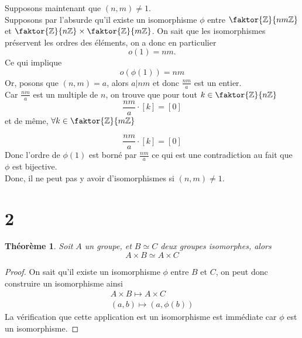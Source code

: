 \documentclass[11pt, a4paper, twoside]{article}
\newtheorem{thm}{Théorème}
\newcommand{\f}{\faktor}
\begin{document}
Supposons maintenant que $( n,m) \neq1$.\\
Supposons par l'absurde qu'il existe un isomorphisme $\phi$ entre $\f { \mathbb{Z}} { nm \mathbb{Z}} $ et $\f { \mathbb{Z}} { n\mathbb{Z}} \times\f { \mathbb{Z}} { m \mathbb{Z}} $.
On sait que les isomorphismes préservent les ordres des éléments, on a donc en particulier
\[ 
	o( 1) = nm.
\]
Ce qui implique
\[ 
	o(\phi( 1)) = nm
\]
Or, posons que $( n,m) = a$,  alors $a|nm$ et donc $\frac{nm}{a}$ est un entier.\\
Car $\frac{nm}{a}$ est un multiple de $n$, on trouve que pour tout $k \in \f { \mathbb{Z}} { n\mathbb{Z}}$ 
\[ 
\frac{nm}{a} \cdot [ k ] = [ 0 ]
\]
et de même, $\forall k \in\f { \mathbb{Z}} { m\mathbb{Z}} $

\[ 
\frac{nm}{a} \cdot [ k ] = [ 0 ]
\]
Donc l'ordre de $ \phi( 1) $ est borné par $\frac{nm}{a}$ ce qui est une contradiction au fait que $\phi$ est bijective.\\
Donc, il ne peut pas y avoir d'isomorphismes si $( n,m) \neq 1$.
\section*{2}
\begin{thm}
Soit $A$ un groupe, et $B\simeq C$ deux groupes isomorphes, alors
\[ 
A \times B \simeq A \times C
\]
\end{thm}
\begin{proof}
	On sait qu'il existe un isomorphisme $\phi$ entre $B$ et $C$, on peut donc construire un isomorphisme ainsi
	\begin{align*}
	A \times B \mapsto A \times C\\
	(a,b) \mapsto ( a, \phi( b) ) 
	\end{align*}
La vérification que cette application est un isomorphisme est immédiate car $\phi$ est un isomorphisme.
\end{proof}
	
\end{document}
